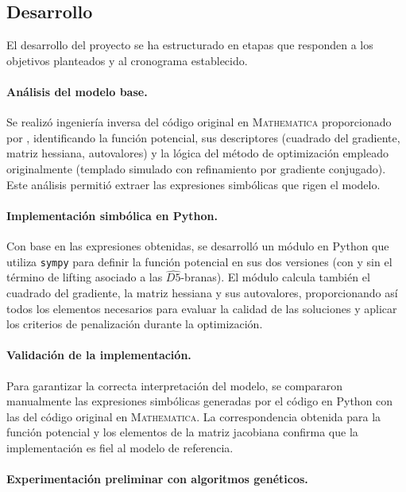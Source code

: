\subsection{Desarrollo}



El desarrollo del proyecto se ha estructurado en etapas que
responden a los objetivos planteados y al cronograma
establecido.


\paragraph{Análisis del modelo base.}

Se realizó ingeniería inversa del código original en
\textsc{Mathematica} proporcionado por \cite{Damian_2022},
identificando la función potencial, sus descriptores
(cuadrado del gradiente, matriz hessiana, autovalores) y la
lógica del método de optimización empleado originalmente
(templado simulado con refinamiento por gradiente conjugado).
Este análisis permitió extraer las expresiones simbólicas que
rigen el modelo.


\paragraph{Implementación simbólica en Python.}

Con base en las expresiones obtenidas, se desarrolló un
módulo en Python que utiliza \texttt{sympy} para definir la
función potencial en sus dos versiones (con y sin el término
de lifting asociado a las $\widehat{D5}$-branas). El módulo
calcula también el cuadrado del gradiente, la matriz hessiana y
sus autovalores, proporcionando así todos los elementos
necesarios para evaluar la calidad de las soluciones y
aplicar los criterios de penalización durante la optimización.


\paragraph{Validación de la implementación.}

Para garantizar la correcta interpretación del modelo, se
compararon manualmente las expresiones simbólicas generadas
por el código en Python con las del código original en
\textsc{Mathematica}. La correspondencia obtenida para la
función potencial y los elementos de la matriz jacobiana
confirma que la implementación es fiel al modelo de
referencia.


\paragraph{Experimentación preliminar con algoritmos
genéticos.}

